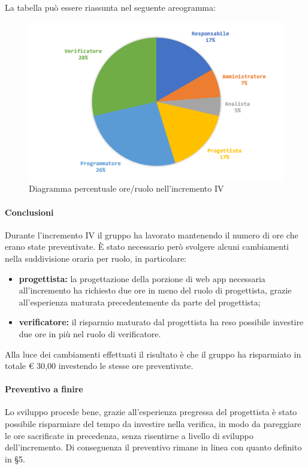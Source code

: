 			La tabella può essere riassunta nel seguente areogramma:
			\begin{figure}[H]
				\centering
				\includegraphics[width=0.8\linewidth]{images/consuntivo/ConsIncr4-2.png}
				\caption{Diagramma percentuale ore/ruolo nell'incremento IV}
				\label{fig:consuntivo diagramma costi ruolo incremento IV}
			\end{figure}
		
		\paragraph{Conclusioni}
			Durante l'incremento IV il gruppo ha lavorato mantenendo il numero di ore che erano state preventivate.
			È stato necessario però svolgere alcuni cambiamenti nella suddivisione oraria per ruolo, in particolare:
			\begin{itemize}
				\item \textbf{progettista:} la progettazione della porzione di web app necessaria all'incremento ha richiesto due ore in meno del ruolo di progettista, grazie all'esperienza maturata precedentemente da parte del progettista;
				\item \textbf{verificatore:} il risparmio maturato dal progettista ha reso possibile investire due ore in più nel ruolo di verificatore.
			\end{itemize}
			Alla luce dei cambiamenti effettuati il risultato è che il gruppo ha risparmiato in totale € 30,00 investendo le stesse ore preventivate.
		
		\paragraph{Preventivo a finire}
			Lo sviluppo procede bene, grazie all'esperienza pregressa del progettista è stato possibile risparmiare del tempo da investire nella verifica, in modo da pareggiare le ore sacrificate in precedenza, senza risentirne a livello di sviluppo dell'incremento.
			\newline
			Di conseguenza il preventivo rimane in linea con quanto definito in \S5.
		
